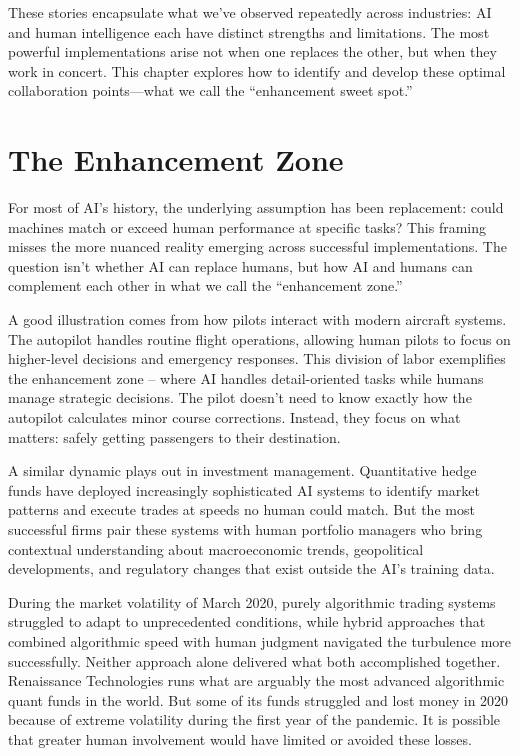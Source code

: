 \documentclass[
  Letterpaper,
]{scrbook}
\begin{document}
These stories encapsulate what we've observed repeatedly across
industries: AI and human intelligence each have distinct strengths and
limitations. The most powerful implementations arise not when one
replaces the other, but when they work in concert. This chapter explores
how to identify and develop these optimal collaboration points---what we
call the ``enhancement sweet spot.''

\section{The Enhancement Zone}\label{the-enhancement-zone}

For most of AI's history, the underlying assumption has been
replacement: could machines match or exceed human performance at
specific tasks? This framing misses the more nuanced reality emerging
across successful implementations. The question isn't whether AI can
replace humans, but how AI and humans can complement each other in what
we call the ``enhancement zone.''

A good illustration comes from how pilots interact with modern aircraft
systems. The autopilot handles routine flight operations, allowing human
pilots to focus on higher-level decisions and emergency responses. This
division of labor exemplifies the enhancement zone -- where AI handles
detail-oriented tasks while humans manage strategic decisions. The pilot
doesn't need to know exactly how the autopilot calculates minor course
corrections. Instead, they focus on what matters: safely getting
passengers to their destination.

A similar dynamic plays out in investment management. Quantitative hedge
funds have deployed increasingly sophisticated AI systems to identify
market patterns and execute trades at speeds no human could match. But
the most successful firms pair these systems with human portfolio
managers who bring contextual understanding about macroeconomic trends,
geopolitical developments, and regulatory changes that exist outside the
AI's training data.

During the market volatility of March 2020, purely algorithmic trading
systems struggled to adapt to unprecedented conditions, while hybrid
approaches that combined algorithmic speed with human judgment navigated
the turbulence more successfully. Neither approach alone delivered what
both accomplished together. Renaissance Technologies runs what are
arguably the most advanced algorithmic quant funds in the world. But
some of its funds struggled and lost money in 2020 because of extreme
volatility during the first year of the pandemic. It is possible that
greater human involvement would have limited or avoided these losses.
\end{document}
